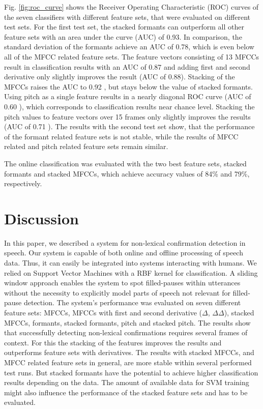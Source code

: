 \documentclass[letterpaper]{article}
\begin{document}
Fig. \ref{fig:roc_curve} shows the Receiver Operating Characteristic (ROC) curves of the seven classifiers with different feature sets, that were evaluated on different test sets. For the first test set, the stacked formants can outperform all other feature sets with an area under the curve (AUC) of 0.93. 
In comparison, the standard deviation of the formants achieve an AUC of 0.78, which is even below all of the MFCC related feature sets. 
The feature vectors consisting of 13 MFCCs result in classification results with an AUC of 0.87 
and adding first and second derivative only slightly improves the result (AUC of 0.88).
Stacking of the MFCCs raises the AUC to 0.92
, but stays below the value of stacked formants.
Using pitch as a single feature results in a nearly diagonal ROC curve (AUC of 0.60
), which corresponds to classification results near chance level. Stacking the pitch values to feature vectors over 15 frames only slightly improves the results (AUC of 0.71
).
The results with the second test set show, that the performance of the formant related feature sets is not stable, while the results of MFCC related and pitch related feature sets remain similar.

The online classification was evaluated with the two best feature sets, stacked formants and stacked MFCCs, which achieve accuracy values of 84\% and 79\%, respectively.
\section{Discussion}
In this paper, we described a system for non-lexical confirmation detection in speech. 
Our system is capable of both online and offline processing of speech data. Thus, it can easily be integrated into systems interacting with humans. 
We relied on Support Vector Machines with a RBF kernel for classification. A sliding window approach enables the system to spot filled-pauses within utterances without the necessity to explicitly model parts of speech not relevant for filled-pause detection. 
The system's performance was evaluated on seven different feature sets: MFCCs, MFCCs with first and second derivative ($\Delta$, $\Delta\Delta$), stacked MFCCs, formants, stacked formants, pitch and stacked pitch. 
The results show that successfully detecting non-lexical confirmations requires several frames of context. For this the stacking of the features improves the results and outperforms feature sets with derivatives. 
The results with stacked MFCCs, and MFCC related feature sets in general, are more stable within several performed test runs. But stacked formants have the potential to achieve higher classification results depending on the data. The amount of available data for SVM training might also influence the performance of the stacked feature sets and has to be evaluated.
\end{document}
